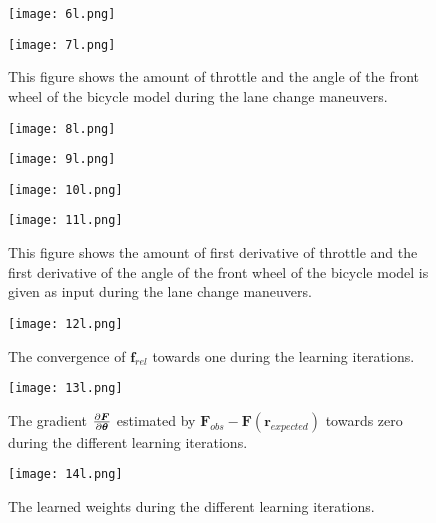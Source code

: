 \begin{figure}[h!]
	\centering
	\texttt{[image: 6l.png]}
	\label{fig:lat_acc_val}
\end{figure}


\begin{figure}[h!]
	\centering
	\texttt{[image: 7l.png]}
	\caption{This figure shows the amount of throttle and the angle of the front wheel of the bicycle model during the lane change maneuvers.}
	\label{fig:app_delta}
\end{figure}


\begin{figure}[h!]
	\centering
	\texttt{[image: 8l.png]}
	\label{fig:lat_acc_val}
\end{figure}


\begin{figure}[h!]
	\centering
	\texttt{[image: 9l.png]}
	\label{fig:lat_acc_val}
\end{figure}


\begin{figure}[h!]
	\centering
	\texttt{[image: 10l.png]}
	\label{fig:lat_acc_val}
\end{figure}


\begin{figure}[h!]
	\centering
	\texttt{[image: 11l.png]}
	\caption{This figure shows the amount of first derivative of throttle and the first derivative of the angle of the front wheel of the bicycle model is given as input during the lane change maneuvers.}
	\label{fig:app_delta_dot}
\end{figure}


\begin{figure}[h!]
	\centering
	\texttt{[image: 12l.png]}	
	\caption{The convergence of $\bm{f}_{rel}$ towards one during the learning iterations.}
	\label{fig:app_conv}
\end{figure}


\begin{figure}[h!]
	\centering
	\texttt{[image: 13l.png]}
	\caption{The gradient $\pdv{\bm{F}}{\bm{\theta}}$ estimated by $\bm{F}_{obs} - \bm{F}(\bm{r}_{expected})$ towards zero during the different learning iterations. }
	\label{fig:app_grad}
\end{figure}

\begin{figure}[h!]
	\centering
	\texttt{[image: 14l.png]}
	\caption{The learned weights during the different learning iterations.}
	\label{fig:app_weights}
	
\end{figure}


